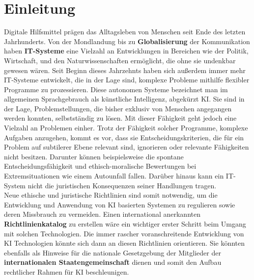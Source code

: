 \documentclass[a4paper,11pt]{article}
\begin{document}
	\section{Einleitung}
Digitale Hilfsmittel prägen das Alltagsleben von Menschen seit Ende des letzten Jahrhunderts. Von der Mondlandung bis zu \textbf{Globalisierung} der Kommunikation haben \textbf{IT-Systeme} eine Vielzahl an Entwicklungen in Bereichen wie der Politik, Wirtschaft, und den Naturwissenschaften ermöglicht, die ohne sie undenkbar gewesen wären. Seit Beginn dieses Jahrzehnts haben sich außerdem immer mehr IT-Systeme entwickelt, die in der Lage sind, komplexe Probleme mithilfe flexibler Programme zu prozessieren. Diese autonomen Systeme bezeichnet man im allgemeinen Sprachgebrauch als künstliche Intelligenz, abgekürzt KI. Sie sind in der Lage, Problemstellungen, die bisher exklusiv von Menschen angegangen werden konnten, selbstständig zu lösen. 
Mit dieser Fähigkeit geht jedoch eine Vielzahl an Problemen einher. Trotz der Fähigkeit solcher Programme, komplexe Aufgaben anzugehen, kommt es vor, dass sie Entscheidungskriterien, die für ein Problem auf subtilerer Ebene relevant sind, ignorieren oder relevante Fähigkeiten nicht besitzen. Darunter können beispielsweise die spontane Entscheidungsfähigkeit und ethisch-moralische Bewertungen bei Extremsituationen wie einem Autounfall fallen. Darüber hinaus kann ein IT-System nicht die juristischen Konsequenzen seiner Handlungen tragen. \\
Neue ethische und juristische Richtlinien sind somit notwendig, um die Entwicklung und Anwendung von KI basierten Systemen zu regulieren sowie deren Missbrauch zu vermeiden. Einen international anerkannten \textbf{Richtlinienkatalog} zu erstellen wäre ein wichtiger erster Schritt beim Umgang mit solchen Technologien. Die immer rascher voranschreitende Entwicklung von KI Technologien könnte sich dann an diesen Richtlinien orientieren. Sie könnten ebenfalls als Hinweise für die nationale Gesetzgebung der Mitglieder der \textbf{internationalen Staatengemeinschaft} dienen und somit den Aufbau rechtlicher Rahmen für KI beschleunigen. 

  \newpage
\end{document}
